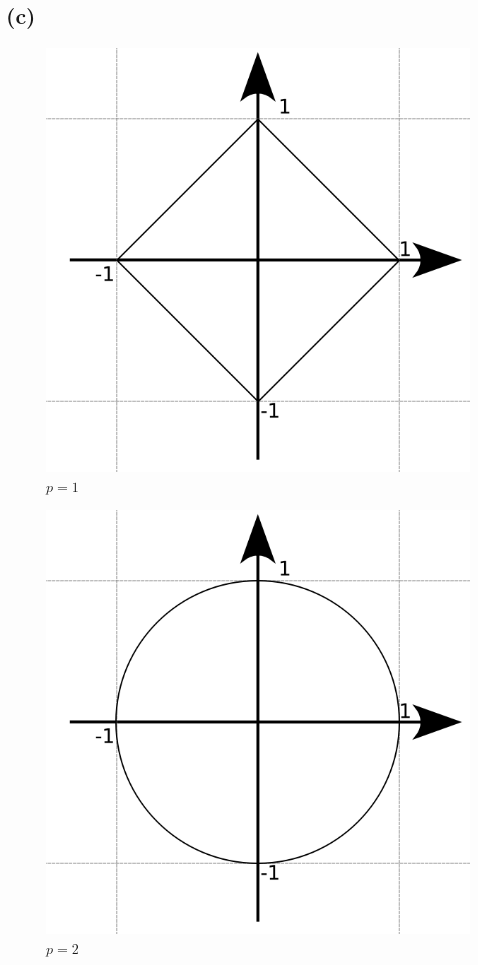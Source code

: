 \documentclass{llncs}
\begin{document}
\subsection*{(c)}
\begin{figure}[h]
	\centering
	\includegraphics[width=1.0\textwidth]{p_1-kreis.png}
	\caption{$p=1$}
\end{figure}
\begin{figure}[h]
	\centering
	\includegraphics[width=1.0\textwidth]{p_2-kreis.png}
	\caption{$p=2$}
\end{figure}
\end{document}

